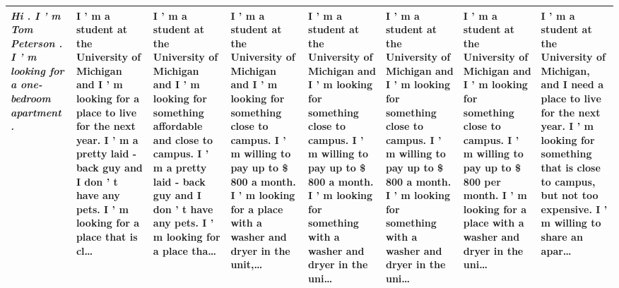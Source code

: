 \begin{table}[t]
\begin{tabularx}{\textwidth}{p{} X X X X X X X}
\textit{Hi . I ’ m Tom Peterson . I ’ m looking for a one-bedroom apartment .} & I ’ m a student at the University of Michigan and I ’ m looking for a place to live for the next year. I ’ m a pretty laid - back guy and I don ’ t have any pets. I ’ m looking for a place that is cl… & I ’ m a student at the University of Michigan and I ’ m looking for something affordable and close to campus. I ’ m a pretty laid - back guy and I don ’ t have any pets. I ’ m looking for a place tha… & I ’ m a student at the University of Michigan and I ’ m looking for something close to campus. I ’ m willing to pay up to \$ 800 a month. I ’ m looking for a place with a washer and dryer in the unit,… & I ’ m a student at the University of Michigan and I ’ m looking for something close to campus. I ’ m willing to pay up to \$ 800 a month. I ’ m looking for something with a washer and dryer in the uni… & I ’ m a student at the University of Michigan and I ’ m looking for something close to campus. I ’ m willing to pay up to \$ 800 a month. I ’ m looking for something with a washer and dryer in the uni… & I ’ m a student at the University of Michigan and I ’ m looking for something close to campus. I ’ m willing to pay up to \$ 800 per month. I ’ m looking for a place with a washer and dryer in the uni… & I ’ m a student at the University of Michigan, and I need a place to live for the next year. I ’ m looking for something that is close to campus, but not too expensive. I ’ m willing to share an apar… \\
\bottomrule
\end{tabularx}
\end{table}
